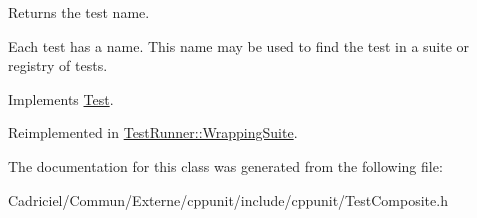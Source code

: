 Returns the test name. 

Each test has a name. This name may be used to find the test in a suite or registry of tests. 

Implements \hyperlink{class_test_a5e024da199f811a33264e432c21dcc94}{Test}.



Reimplemented in \hyperlink{class_test_runner_1_1_wrapping_suite_a500c7e2413a4830b87d8ab061251f856}{Test\-Runner\-::\-Wrapping\-Suite}.



The documentation for this class was generated from the following file\-:\begin{DoxyCompactItemize}
\item 
Cadriciel/\-Commun/\-Externe/cppunit/include/cppunit/Test\-Composite.\-h\end{DoxyCompactItemize}
